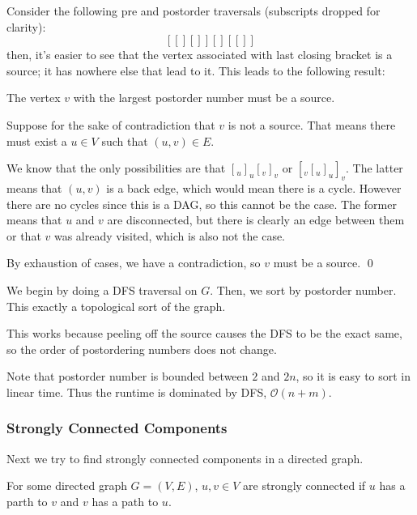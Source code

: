 Consider the following pre and postorder traversals (subscripts dropped for clarity):
\[ [[][]] [] [[]] \]
then, it's easier to see that the vertex associated with last closing bracket is a source; it has nowhere else that lead to it.
This leads to the following result:
\begin{theorem} 
    The vertex $v$ with the largest postorder number must be a source.

    \begin{proof*}
        Suppose for the sake of contradiction that $v$ is not a source. That means there must exist a $u \in V$ such that $(u, v) \in E$.

        We know that the only possibilities are that $[_u ]_u [_v ]_v$ or $[_v [_u ]_u ]_v$. The latter means that $(u, v)$ is a back edge, which
        would mean there is a cycle. However there are no cycles since this is a DAG, so this cannot be the case. The former means that $u$ and $v$
        are disconnected, but there is clearly an edge between them or that $v$ was already visited, which is also not the case.

        By exhaustion of cases, we have a contradiction, so $v$ must be a source. \qed
    \end{proof*}
\end{theorem}

\begin{algothm} 
    We begin by doing a DFS traversal on $G$. Then, we sort by postorder number. This exactly a topological sort of the graph.

    This works because peeling off the source causes the DFS to be the exact same, so the order of postordering numbers does not change.

    Note that postorder number is bounded between $2$ and $2n$, so it is easy to sort in linear time. Thus the runtime is dominated by DFS,
    $\mathcal{O}(n + m)$.
\end{algothm}

\subsubsection{Strongly Connected Components}

Next we try to find strongly connected components in a directed graph.

\begin{definition} 
    For some directed graph $G = (V, E)$, $u, v \in V$ are strongly connected if $u$ has a parth to $v$ and $v$ has a path to $u$.
\end{definition}

